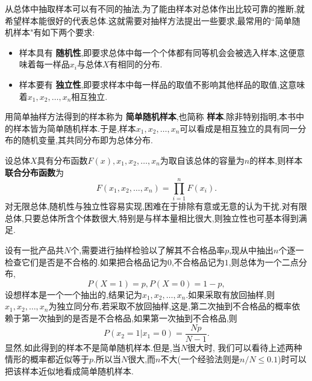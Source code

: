 从总体中抽取样本可以有不同的抽法,为了能由样本对总体作出比较可靠的推断,就希望样本能很好的代表总体.这就需要对抽样方法提出一些要求,最常用的``简单随机样本"有如下两个要求:
\begin{itemize}
\item 样本具有 \textbf{随机性},即要求总体中每一个个体都有同等机会会被选入样本,这便意味着每一样品$x_i$与总体$X$有相同的分布.
\item 样本要有 \textbf{独立性},即要求样本中每一样品的取值不影响其他样品的取值,这意味着$x_1,x_2,\dotsc,x_n$相互独立.
\end{itemize}

用简单抽样方法得到的样本称为 \textbf{简单随机样本},也简称 \textbf{样本}.除非特别指明,本书中的样本皆为简单随机样本.于是,样本$x_1,x_2,\dotsc,x_n$可以看成是相互独立的具有同一分布的随机变量,其共同分布即为总体分布.

设总体$X$具有分布函数$F(x),x_1,x_2,\dotsc,x_n$为取自该总体的容量为$n$的样本,则样本 \textbf{联合分布函数}为
\[F(x_1,x_2,\dotsc,x_n)=\prod_{i=1}^nF(x_i).\]
对无限总体,随机性与独立性容易实现,困难在于排除有意或无意的认为干扰.对有限总体,只要总体所含个体数很大,特别是与样本量相比很大,则独立性也可基本得到满足.
\begin{example}
设有一批产品共$N$个,需要进行抽样检验以了解其不合格品率$p$,现从中抽出$n$个逐一检查它们是否是不合格的.如果把合格品记为$0$,不合格品记为$1$,则总体为一个二点分布,
\[P(X=1)=p,P(X=0)=1-p,\]
设想样本是一个一个抽出的,结果记为$x_1,x_2,\dotsc,x_n$.如果采取有放回抽样,则$x_1,x_2,\dotsc,x_n$为独立同分布,若采取不放回抽样,这是,第二次抽到不合格品的概率依赖于第一次抽到的是否是不合格品,如果第一次抽到不合格品,则
\[P(x_2=1|x_1=0)=\frac{Np}{N-1}.\]
显然,如此得到的样本不是简单随机样本.但是,当$N$很大时, 我们可以看待上述两种情形的概率都近似等于$p$.所以当$N$很大,而$n$不大(一个经验法则是$n/N\leq0.1$)时可以把该样本近似地看成简单随机样本.
\end{example}


